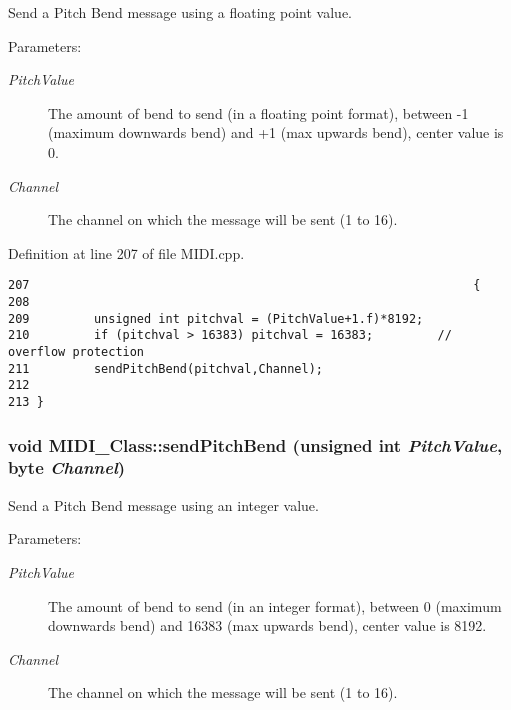 Send a Pitch Bend message using a floating point value. \begin{Desc}
\item[Parameters:]
\begin{description}
\item[{\em PitchValue}]The amount of bend to send (in a floating point format), between -1 (maximum downwards bend) and +1 (max upwards bend), center value is 0. \item[{\em Channel}]The channel on which the message will be sent (1 to 16). \end{description}
\end{Desc}


Definition at line 207 of file MIDI.cpp.

\begin{Code}\begin{verbatim}207                                                              {
208 
209         unsigned int pitchval = (PitchValue+1.f)*8192;
210         if (pitchval > 16383) pitchval = 16383;         // overflow protection
211         sendPitchBend(pitchval,Channel);
212         
213 }
\end{verbatim}
\end{Code}


\hypertarget{class_m_i_d_i___class_45dcd73e3b8a107334e687750514f8b5}{
\subsubsection[{sendPitchBend}]{\setlength{\rightskip}{0pt plus 5cm}void MIDI\_\-Class::sendPitchBend (unsigned int {\em PitchValue}, \/  {\bf byte} {\em Channel})}}
\label{class_m_i_d_i___class_45dcd73e3b8a107334e687750514f8b5}


Send a Pitch Bend message using an integer value. \begin{Desc}
\item[Parameters:]
\begin{description}
\item[{\em PitchValue}]The amount of bend to send (in an integer format), between 0 (maximum downwards bend) and 16383 (max upwards bend), center value is 8192. \item[{\em Channel}]The channel on which the message will be sent (1 to 16). \end{description}
\end{Desc}


